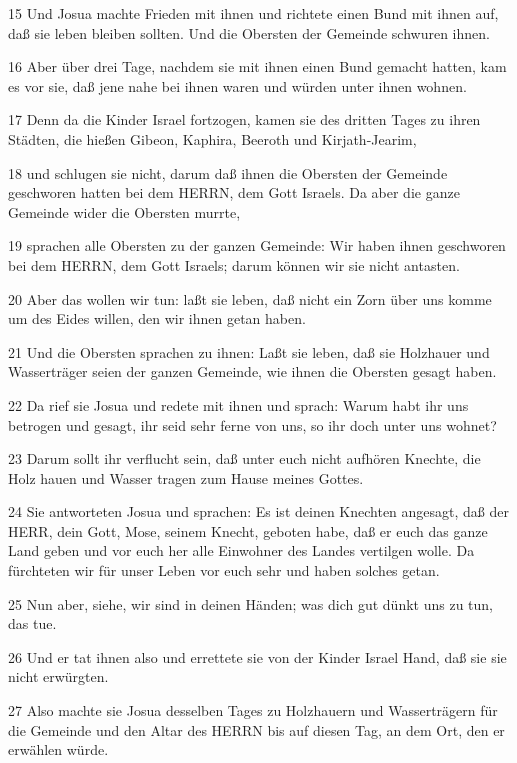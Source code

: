 \par 15 Und Josua machte Frieden mit ihnen und richtete einen Bund mit ihnen auf, daß sie leben bleiben sollten. Und die Obersten der Gemeinde schwuren ihnen.
\par 16 Aber über drei Tage, nachdem sie mit ihnen einen Bund gemacht hatten, kam es vor sie, daß jene nahe bei ihnen waren und würden unter ihnen wohnen.
\par 17 Denn da die Kinder Israel fortzogen, kamen sie des dritten Tages zu ihren Städten, die hießen Gibeon, Kaphira, Beeroth und Kirjath-Jearim,
\par 18 und schlugen sie nicht, darum daß ihnen die Obersten der Gemeinde geschworen hatten bei dem HERRN, dem Gott Israels. Da aber die ganze Gemeinde wider die Obersten murrte,
\par 19 sprachen alle Obersten zu der ganzen Gemeinde: Wir haben ihnen geschworen bei dem HERRN, dem Gott Israels; darum können wir sie nicht antasten.
\par 20 Aber das wollen wir tun: laßt sie leben, daß nicht ein Zorn über uns komme um des Eides willen, den wir ihnen getan haben.
\par 21 Und die Obersten sprachen zu ihnen: Laßt sie leben, daß sie Holzhauer und Wasserträger seien der ganzen Gemeinde, wie ihnen die Obersten gesagt haben.
\par 22 Da rief sie Josua und redete mit ihnen und sprach: Warum habt ihr uns betrogen und gesagt, ihr seid sehr ferne von uns, so ihr doch unter uns wohnet?
\par 23 Darum sollt ihr verflucht sein, daß unter euch nicht aufhören Knechte, die Holz hauen und Wasser tragen zum Hause meines Gottes.
\par 24 Sie antworteten Josua und sprachen: Es ist deinen Knechten angesagt, daß der HERR, dein Gott, Mose, seinem Knecht, geboten habe, daß er euch das ganze Land geben und vor euch her alle Einwohner des Landes vertilgen wolle. Da fürchteten wir für unser Leben vor euch sehr und haben solches getan.
\par 25 Nun aber, siehe, wir sind in deinen Händen; was dich gut dünkt uns zu tun, das tue.
\par 26 Und er tat ihnen also und errettete sie von der Kinder Israel Hand, daß sie sie nicht erwürgten.
\par 27 Also machte sie Josua desselben Tages zu Holzhauern und Wasserträgern für die Gemeinde und den Altar des HERRN bis auf diesen Tag, an dem Ort, den er erwählen würde.

